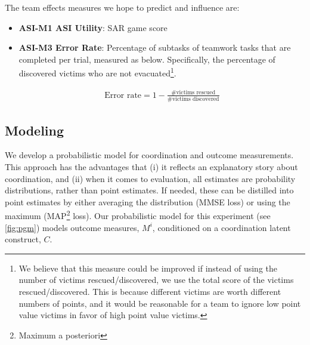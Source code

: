 \noindent The team effects measures we hope to predict and influence are: 

\begin{itemize}

    \item \textbf{ASI-M1 ASI Utility}: SAR game score 

    \item \textbf{ASI-M3 Error Rate}: Percentage of subtasks of teamwork tasks
        that are completed per trial, measured as below.  Specifically, the
        percentage of discovered victims who are not evacuated\footnote{We
            believe that this measure could be improved if instead of using the
            number of victims rescued/discovered, we use the total score of the
            victims rescued/discovered. This is because different victims are
            worth different numbers of points, and it would be reasonable for a
            team to ignore low point value victims in favor of high point value
        victims.}. 

        \begin{align}
            \text{Error rate} = 1 - \frac{\text{\# victims rescued}}{\text{\# victims discovered}}
        \end{align}

\end{itemize}

\subsection{Modeling}
\label{subsec:modeling}

    We develop a probabilistic model for coordination and outcome measurements.
    This approach has the advantages that (i) it reflects an explanatory story
    about coordination, and (ii) when it comes to evaluation, all estimates are
    probability distributions, rather than point estimates.  If needed, these
    can be distilled into point estimates by either averaging the distribution
    (MMSE loss) or using the maximum (MAP\footnote{Maximum a posteriori} loss). 
    Our probabilistic model for this experiment (see  \autoref{fig:pgm}) models
    outcome measures, $M^i$, conditioned on a coordination latent construct,
    $C$. 

